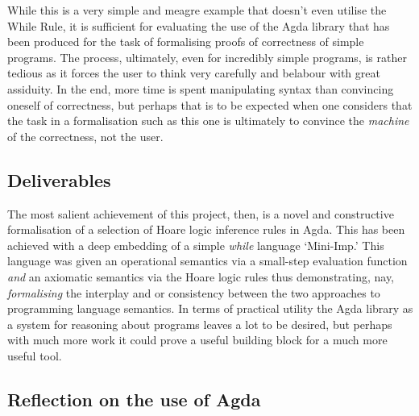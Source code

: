 \documentclass[oneside,12pt]{article}
\begin{document}
{\centering \small }

\vspace{-2em}

{\hspace*{10em} \begin{minipage}{0.8\textwidth} \small  \end{minipage}}

\vspace{-2em}

{\centering \small }

While this is a very simple and meagre example that doesn't even utilise the While Rule, it is sufficient for evaluating the use of the Agda library that has been produced for the task of formalising proofs of correctness of simple programs. The process, ultimately, even for incredibly simple programs, is rather tedious as it forces the user to think very carefully and belabour with great assiduity. In the end, more time is spent manipulating syntax than convincing oneself of correctness, but perhaps that is to be expected when one considers that the task in a formalisation such as this one is ultimately to convince the \emph{machine} of the correctness, not the user.


\subsection{Deliverables}
\label{sec:deliv}

The most salient achievement of this project, then, is a novel and constructive formalisation of a selection of Hoare logic inference rules in Agda. This has been achieved with a deep embedding of a simple \emph{while} language `Mini-Imp.' This language was given an operational semantics via a small-step evaluation function \emph{and} an axiomatic semantics via the Hoare logic rules thus demonstrating, nay, \emph{formalising} the interplay and or consistency between the two approaches to programming language semantics. In terms of practical utility the Agda library as a system for reasoning about programs leaves a lot to be desired, but perhaps with much more work it could prove a useful building block for a much more useful tool.



\subsection{Reflection on the use of Agda}
\end{document}
